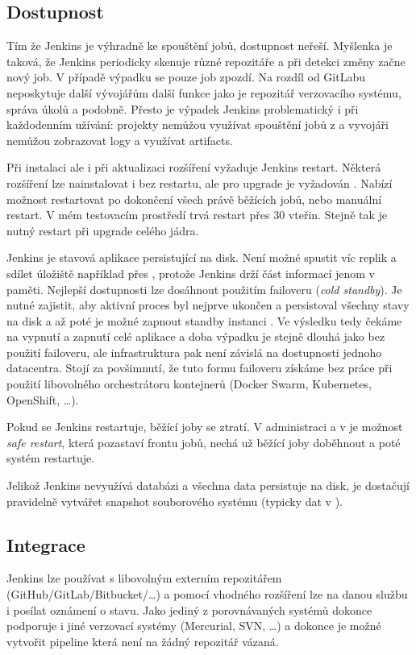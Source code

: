     \subsection{Dostupnost}
        Tím že Jenkins je výhradně ke spouštění jobů, dostupnost neřeší. Myšlenka je taková, že Jenkins periodicky skenuje různé repozitáře a při detekci změny začne nový job. V případě výpadku se pouze job zpozdí. Na rozdíl od GitLabu neposkytuje další vývojářům další funkce jako je repozitář verzovacího systému, správa úkolů a podobně. Přesto je výpadek Jenkins problematický i při každodenním užívání: projekty nemůžou využívat spouštění jobů z  a vyvojáři nemůžou zobrazovat logy a využívat artifacts.

        Při instalaci ale i při aktualizaci rozšíření vyžaduje Jenkins restart. Některá rozšíření lze nainstalovat i bez restartu, ale pro upgrade je vyžadován \cite{jenkins-norestart}. Nabízí možnost restartovat po dokončení všech právě běžících jobů, nebo manuální restart. V mém testovacím prostředí trvá restart přes 30 vteřin. Stejně tak je nutný restart při upgrade celého jádra.

        Jenkins je stavová aplikace persistující na disk. Není možné spustit víc replik a sdílet úložiště například přes , protože Jenkins drží část informací jenom v paměti. Nejlepší dostupnosti lze dosáhnout použitím failoveru (\textit{cold standby}). Je nutné zajistit, aby aktivní proces byl nejprve ukončen a persistoval všechny stavy na disk a až poté je možné zapnout standby instanci \cite{jenkins-ha}. Ve výsledku tedy čekáme na vypnutí a zapnutí celé aplikace a doba výpadku je stejně dlouhá jako bez použití failoveru, ale infrastruktura pak není závislá na dostupnosti jednoho datacentra. Stojí za povšimnutí, že tuto formu failoveru získáme bez práce při použití libovolného orchestrátoru kontejnerů (Docker Swarm, Kubernetes, OpenShift, \ldots).

        Pokud se Jenkins restartuje, běžící joby se ztratí. V administraci a v  je možnost \textit{safe restart}, která pozastaví frontu jobů, nechá už běžící joby doběhnout a poté systém restartuje.

        Jelikož Jenkins nevyužívá databázi a všechna data persistuje na disk, je dostačují pravidelně vytvářet snapshot souborového systému (typicky dat v ).

    \subsection{Integrace}
        Jenkins lze používat s libovolným externím repozitářem (GitHub/GitLab/Bitbucket/\ldots) a pomocí vhodného rozšíření lze na danou službu i posílat oznámení o stavu. Jako jediný z porovnávaných systémů dokonce podporuje i jiné verzovací systémy (Mercurial, SVN, \ldots) a dokonce je možné vytvořit pipeline která není na žádný repozitář vázaná.

